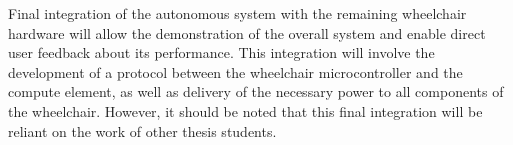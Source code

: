 \documentclass[12pt]{article}
\begin{document}
Final integration of the autonomous system with the remaining wheelchair hardware
will allow the demonstration of the overall system and enable direct user feedback about its performance.
This integration will involve the development of a protocol between the wheelchair microcontroller and the compute
element, as well as delivery of the necessary power to all components of the wheelchair.
However, it should be noted that this final integration will be reliant on the work of other thesis students.


\pagebreak





\printbibliography[heading=bibnumbered]
\end{document}
